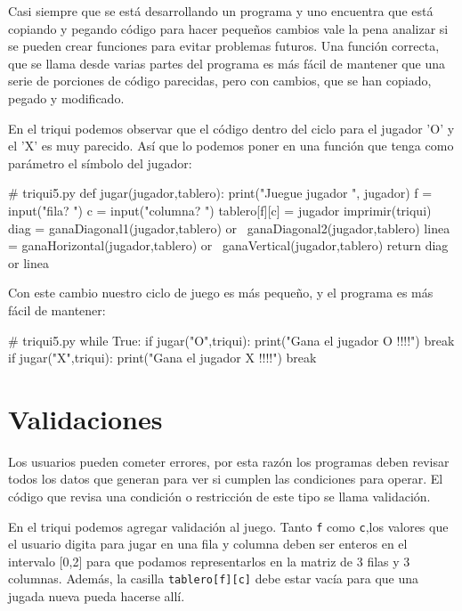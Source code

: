 
Casi siempre que se está desarrollando un programa y uno encuentra
que está copiando y pegando código para hacer pequeños cambios vale
la pena analizar si se pueden crear funciones para evitar problemas
futuros. Una función correcta, que se llama desde varias partes del
programa es más fácil de mantener que una serie de porciones de código
parecidas, pero con cambios, que se han copiado, pegado y modificado.

En el triqui podemos observar que el código dentro del ciclo para
el jugador 'O' y el 'X' es muy parecido. Así que lo podemos poner
en una función que tenga como parámetro el símbolo del jugador:

\begin{pythoncode}
# triqui5.py
def jugar(jugador,tablero):
    print("Juegue jugador ", jugador)
    f = input("fila? ")
    c = input("columna? ")
    tablero[f][c] = jugador
    imprimir(triqui)
    diag = ganaDiagonal1(jugador,tablero) or \
           ganaDiagonal2(jugador,tablero)
    linea = ganaHorizontal(jugador,tablero) or \ 
            ganaVertical(jugador,tablero)
    return  diag or linea
\end{pythoncode}

Con este cambio nuestro ciclo de juego es más pequeño, y el programa
es más fácil de mantener:

\begin{pythoncode}
# triqui5.py
while True:
    if jugar("O",triqui):
        print("Gana el jugador O !!!!")
        break
    if jugar("X",triqui):
        print("Gana el jugador X !!!!")
        break
\end{pythoncode}

\section{Validaciones}


Los usuarios pueden cometer errores, por esta razón los programas
deben revisar todos los datos que generan para ver si cumplen las
condiciones para operar. El código que revisa una condición o restricción
de este tipo se llama validación.

En el triqui podemos agregar validación al juego. Tanto \texttt{f}
como \texttt{c},los valores que el usuario digita para jugar en una
fila y columna deben ser enteros en el intervalo {[}0,2{]} para que
podamos representarlos en la matriz de 3 filas y 3 columnas. Además,
la casilla \texttt{tablero{[}f{]}{[}c{]}} debe estar vacía para que
una jugada nueva pueda hacerse allí.

